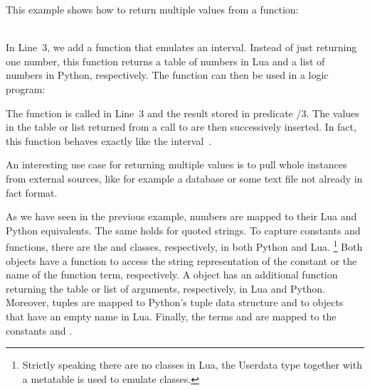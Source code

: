 \begin{example}
This example shows how to return multiple values from a function:
\\[-8pt] %
\begin{minipage}[t]{0.5\textwidth}

\end{minipage}
\begin{minipage}[t]{0.5\textwidth}

\end{minipage}\\
In Line~3, we add a function that emulates an interval.
Instead of just returning one number,
this function returns a table of numbers in Lua and a list of numbers in Python, respectively.
The  function can then be used in a logic program:%
%

%
The function is called in Line~3 and the result stored in predicate /$3$.
The values in the table or list returned from a call to  are then successively inserted.
In fact, this function behaves exactly like the interval~.

An interesting use case for returning multiple values is to pull whole
instances from external sources, like for example a database or some text file not already in fact format.
\end{example}

As we have seen in the previous example,
numbers are mapped to their Lua and Python equivalents.
The same holds for quoted strings.
To capture constants and functions,
there are the  and  classes, respectively, in both Python and Lua.%
\footnote{Strictly speaking there are no classes in Lua, the Userdata type together with a metatable is used to emulate classes.}
Both objects have a function  to access the string representation of the constant or the name of the function term, respectively.
A  object has an additional function  returning the table or list of arguments, respectively, in Lua and Python.
Moreover,
tuples are mapped to Python's tuple data structure and to  objects
that have an empty name in Lua.
Finally, the terms  and  are mapped to the constants  and .

